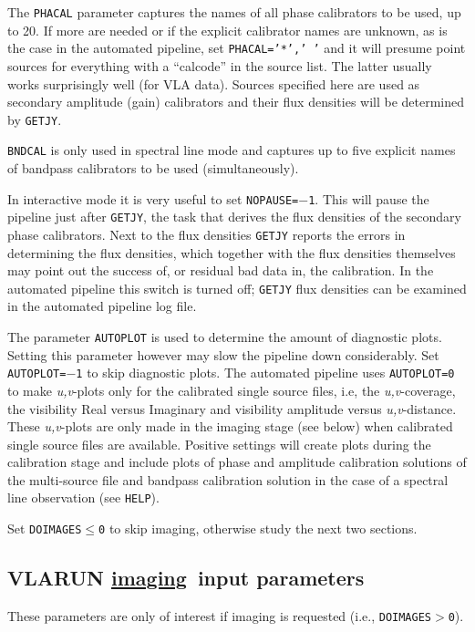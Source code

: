 The {\tt PHACAL} parameter captures the names of all phase
calibrators to be used, up to 20. If more are needed or if the
explicit calibrator names are unknown, as is the case in the automated
pipeline, set {\tt PHACAL='*','~'} and it will presume point sources
for everything with a ``calcode'' in the source list. The latter
usually works surprisingly well (for VLA data). Sources specified here
are used as secondary amplitude (gain) calibrators and their flux
densities will be determined by {\tt GETJY}.

{\tt BNDCAL} is only used in spectral line mode and captures up to
five explicit names of bandpass calibrators to be used (simultaneously).

In interactive mode it is very useful to set {\tt NOPAUSE=$-$1}. This
will pause the pipeline just after {\tt GETJY}, the task that derives
the flux densities of the secondary phase calibrators. Next to the
flux densities {\tt GETJY} reports the errors in determining the flux
densities, which together with the flux densities themselves may point
out the success of, or residual bad data in, the calibration. In the
automated pipeline this switch is turned off; {\tt GETJY} flux
densities can be examined in the automated pipeline log file.

The parameter {\tt AUTOPLOT} is used to determine the amount of
diagnostic plots. Setting this parameter however may slow the pipeline
down considerably. Set {\tt AUTOPLOT=$-$1} to skip diagnostic plots. The
automated pipeline uses {\tt AUTOPLOT=0} to make {\it u,v}-plots only for
the calibrated single source files, i.e, the {\it u,v}-coverage, the
visibility Real versus Imaginary and visibility amplitude versus {\it
u,v}-distance. These {\it u,v}-plots are only made in the imaging
stage (see below) when calibrated single source files are
available. Positive settings will create plots during the calibration
stage and include plots of phase and amplitude calibration solutions
of the multi-source file and bandpass calibration solution in the case
of a spectral line observation (see {\tt HELP}).

Set {\tt DOIMAGES$\le$0} to skip imaging, otherwise study the next two
sections.

\subsection{VLARUN \underline{imaging}\ input parameters}
These parameters are only of interest if imaging is requested (i.e.,
{\tt DOIMAGES$>$0}).

